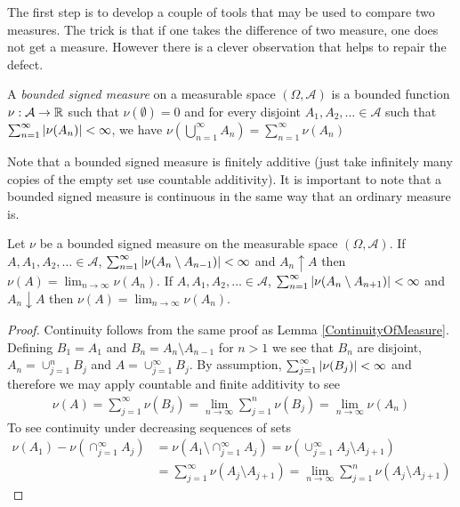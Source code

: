 The first step is to develop a couple of tools that may be used to
compare two measures.  The trick is that if one takes the difference
of two measure, one does not get a measure.  However there is a clever
observation that helps to repair the defect.  
\begin{defn}A \emph{ bounded signed measure} on a measurable space $(\Omega,
  \mathcal{A})$ is a bounded function $\nu : \mathcal{A} \to
  \mathbb{R}$ such that $\nu(\emptyset) = 0$ and for every disjoint $A_1, A_2, \dots \in
  \mathcal{A}$ such that $\sum_{n=1}^\infty \left \vert \nu (A_n) \right \vert  < \infty$, we have $\nu(\bigcup_{n=1}^\infty A_n ) =
  \sum_{n=1}^\infty \nu (A_n)$ 
\end{defn}
Note that a bounded signed measure is finitely additive (just take infinitely many copies of the empty set use countable additivity).
It is important to note that a bounded signed measure is continuous in
the same way that an ordinary measure is.
\begin{prop}\label{ContinuityOfSignedMeasure}Let $\nu$ be a bounded
  signed measure on the measurable space $(\Omega,  \mathcal{A})$.
If $A, A_1, A_2, \dotsc \in \mathcal{A}$, $\sum_{n=1}^\infty \left \vert \nu(A_n \setminus A_{n-1}) \right \vert < \infty$ and $A_n \uparrow A$ then $\nu(A) = \lim_{n \to \infty} \nu(A_n)$. If $A, A_1, A_2, \dotsc \in \mathcal{A}$, $\sum_{n=1}^\infty \left \vert \nu(A_n \setminus A_{n+1}) \right \vert < \infty$ and $A_n \downarrow A$ then $\nu(A) = \lim_{n \to \infty} \nu(A_n)$.
\end{prop}
\begin{proof}
Continuity follows from the same proof as Lemma \ref{ContinuityOfMeasure}.  Defining $B_1 = A_1$ and $B_n = A_n \setminus A_{n-1}$ for $n > 1$ we see that $B_n$ are disjoint, $A_n = \cup_{j=1}^n B_j$ and $A = \cup_{j=1}^\infty B_j$.  By assumption, $\sum_{j=1}^\infty \left \vert \nu(B_j) \right \vert < \infty$ and therefore we may apply countable and finite additivity to see
\begin{align*}
\nu(A) = \sum_{j=1}^\infty \nu(B_j) = \lim_{n \to \infty} \sum_{j=1}^n \nu(B_j) = \lim_{n \to \infty} \nu(A_n)
\end{align*}
To see continuity under decreasing sequences of sets 
\begin{align*}
\nu(A_1) - \nu(\cap_{j=1}^\infty A_j) &= \nu(A_1 \setminus \cap_{j=1}^\infty A_j) = \nu(\cup_{j=1}^\infty A_j \setminus A_{j+1}) \\
&= \sum_{j=1}^\infty\nu(A_j \setminus A_{j+1}) = \lim_{n \to \infty} \sum_{j=1}^n\nu(A_j \setminus A_{j+1}) 
\end{align*}
\end{proof}

